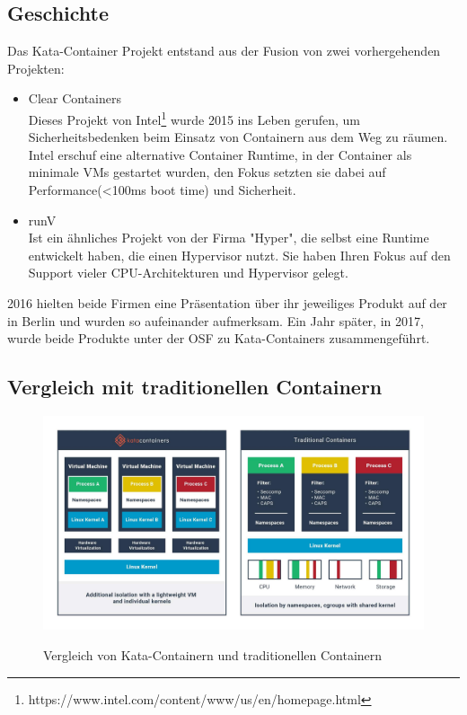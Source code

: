 \subsection{Geschichte}
Das Kata-Container Projekt entstand aus der Fusion von zwei vorhergehenden Projekten:
\begin{itemize}
        \item Clear Containers
        \\Dieses Projekt von Intel\footnote{https://www.intel.com/content/www/us/en/homepage.html} wurde 2015 ins Leben gerufen, um Sicherheitsbedenken beim Einsatz von Containern aus dem Weg zu räumen.
        Intel erschuf eine alternative Container Runtime, in der Container als minimale \ac{VM}s gestartet wurden, den Fokus setzten sie dabei auf Performance(<100ms boot time) und Sicherheit.\cite[S.1]{Kata_Containers}
        \item runV
        \\Ist ein ähnliches Projekt von der Firma "Hyper", die selbst eine Runtime entwickelt haben, die einen Hypervisor nutzt.
        Sie haben Ihren Fokus auf den Support vieler \ac{CPU}-Architekturen und Hypervisor gelegt.\cite[S.1]{Kata_Containers}
\end{itemize}
2016 hielten beide Firmen eine Präsentation über ihr jeweiliges Produkt auf der  in Berlin und wurden so aufeinander aufmerksam.
Ein Jahr später, in 2017, wurde beide Produkte unter der \ac{OSF} zu Kata-Containers zusammengeführt.\cite{kata_history}

\subsection{Vergleich mit traditionellen Containern}

\begin{figure}[ht]
        \caption{Vergleich von Kata-Containern und traditionellen Containern\cite{kata_learn}}
        \centering
        \includegraphics[width=\textwidth]{bilder/katacontainers_traditionalvskata_diagram.jpg}
        \label{fig:kata_vs_traditional}
\end{figure}

